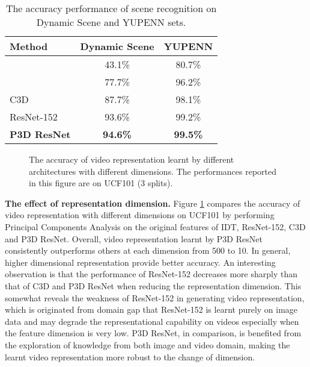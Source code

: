 \documentclass[10pt,twocolumn,letterpaper]{article}
\begin{document}
\begin{table}
\centering
\small
\caption{\small The accuracy performance of scene recognition on Dynamic Scene and YUPENN sets.}
\begin{tabular}{l|c|c} \hline
\textbf{Method}                                          & \textbf{Dynamic Scene} & \textbf{YUPENN} \\ \hline
\cite{Der:CVPR12}                               & 43.1\%                 & 80.7\% \\
\cite{feichtenhofer2014bags}                             & 77.7\%                 & 96.2\% \\
C3D \cite{tran2015learning}                              & 87.7\%                 & 98.1\% \\
ResNet-152 \cite{he2015deep}                              & 93.6\%                 & 99.2\% \\ \hline
\textbf{P3D ResNet}                                   & \textbf{94.6\%}                 & \textbf{99.5\%} \\
\hline
\end{tabular}
\label{tab:scene}
\vspace{-0.15in}
\end{table}



\begin{figure}[!tb]
   \caption{\small The accuracy of video representation learnt by different architectures with different dimensions. The performances reported in this figure are on UCF101 (3 splits).}
   \label{fig:fig5}
   \vspace{-0.2in}
\end{figure}

\textbf{The effect of representation dimension.} Figure \ref{fig:fig5} compares the accuracy of video representation with different dimensions on UCF101 by performing Principal Components Analysis on the original features of IDT, ResNet-152, C3D and P3D ResNet. Overall, video representation learnt by P3D ResNet consistently outperforms others at each dimension from 500 to 10. In general, higher dimensional representation provide better accuracy. An interesting observation is that the performance of ResNet-152 decreases more sharply than that of C3D and P3D ResNet when reducing the representation dimension. This somewhat reveals the weakness of ResNet-152 in generating video representation, which is originated from domain gap that ResNet-152 is learnt purely on image data and may degrade the representational capability on videos especially when the feature dimension is very low. P3D ResNet, in comparison, is benefited from the exploration of knowledge from both image and video domain, making the learnt video representation more robust to the change of dimension.
\end{document}

